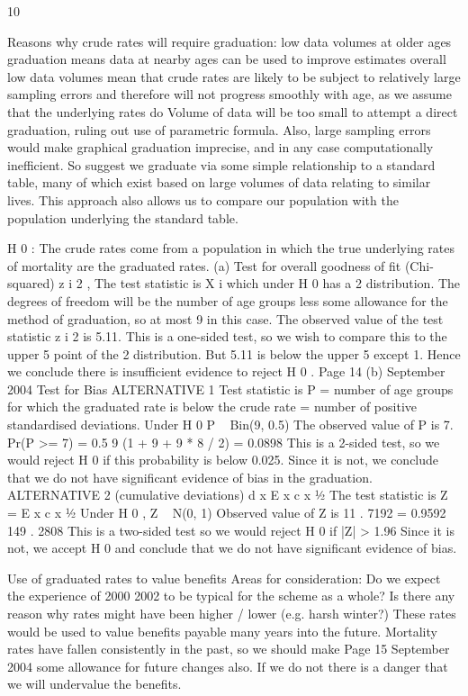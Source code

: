 \documentclass[a4paper,12pt]{article}
\begin{document}
10
\item 
Reasons why crude rates will require graduation:
low data volumes at older ages
graduation means
data at nearby ages can be used to improve estimates
overall low data volumes mean that crude rates are likely to be subject to
relatively large sampling errors and therefore will not progress smoothly
with age, as we assume that the underlying rates do
Volume of data will be too small to attempt a direct graduation, ruling out use
of parametric formula.
Also, large sampling errors would make graphical graduation imprecise, and
in any case computationally inefficient. So suggest we graduate via some
simple relationship to a standard table, many of which exist based on large
volumes of data relating to similar lives. This approach also allows us to
compare our population with the population underlying the standard table.
\item 
H 0 : The crude rates come from a population in which the true underlying rates
of mortality are the graduated rates.
(a)
Test for overall goodness of fit (Chi-squared)
z i 2 ,
The test statistic is X
i
which under H 0 has a
2
distribution.
The degrees of freedom will be the number of age groups less some
allowance for the method of graduation, so at most 9 in this case.
The observed value of the test statistic
z i 2 is 5.11.
This is a one-sided test, so we wish to compare this to the upper 5%
point of the 2 distribution.
But 5.11 is below the upper 5%
except 1.
Hence we conclude there is insufficient evidence to reject H 0 .
Page 14 %
(b)
September 2004
Test for Bias
ALTERNATIVE 1
Test statistic is P = number of age groups for which the graduated rate
is below the crude rate = number of positive standardised deviations.
Under H 0 P ~ Bin(9, 0.5)
The observed value of P is 7.
Pr(P >= 7) = 0.5 9 (1 + 9 + 9 * 8 / 2) = 0.0898
This is a 2-sided test, so we would reject H 0 if this probability is below
0.025.
Since it is not, we conclude that we do not have significant evidence of
bias in the graduation.
ALTERNATIVE 2 (cumulative deviations)
d x E x c x 1⁄2
The test statistic is Z =
E x c x 1⁄2
Under H 0 , Z ~ N(0, 1)
Observed value of Z is
11 . 7192
= 0.9592
149 . 2808
This is a two-sided test so we would reject H 0 if |Z| > 1.96
Since it is not, we accept H 0 and conclude that we do not have
significant evidence of bias.
\item 
Use of graduated rates to value benefits
Areas for consideration:
Do we expect the experience of 2000 2002 to be typical for the scheme as
a whole?
Is there any reason why rates might have been higher / lower (e.g. harsh
winter?)
These rates would be used to value benefits payable many years into the
future.
Mortality rates have fallen consistently in the past, so we should make
Page 15 %
September 2004
some allowance for future changes also. If we do not there is a danger that
we will undervalue the benefits.
\end{document}
